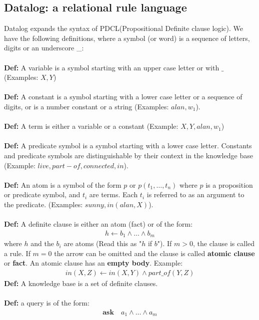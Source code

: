 \documentclass{article}
\def\blu#1{{\color{blu}#1}}
\def\red#1{{\color{red}#1}}
\begin{document}
\subsection*{Datalog: a relational rule language}
Datalog expands the syntax of PDCL(Propositional Definite clause logic). We have the following definitions, where a symbol (or word) is a sequence of letters, digits or an underscore \_:\\
\\
\textbf{Def:} A \red{variable} is a symbol starting with an upper case letter or with $ \_ $ (Examples: $ X, Y $) \\
\\
\textbf{Def:} A \red{constant} is a symbol starting with a lower case letter or a sequence of digits, or is a number constant or a string (Examples: $ alan, w_1 $). \\
\\
\textbf{Def:} A \red{term} is either a variable or a constant (Example: $ X, Y, alan, w_1 $)\\
\\
\textbf{Def:} A \red{predicate symbol} is a symbol starting with a lower case letter. Constants and predicate symbols are distinguishable by their context in the knowledge base (Example: $ live, part-of, connected, in $). \\
\\
\textbf{Def:} An \red{atom} is a symbol of the form \blu{$ p $} or \blu{$ p(t_1, \dots, t_n) $} where \blu{$ p $} is a proposition or predicate symbol, and \blu{$ t_i $} are terms. Each $ t_i $ is referred to as an argument to the predicate. (Examples: $ sunny, in(alan, X) $).\\
\\
\textbf{Def:} A \red{definite clause} is either an atom (fact) or of the form:
\begin{align*}
h \leftarrow b_1 \land \dots \land b_m
\end{align*} 
where $ h $ and the $ b_i $ are atoms (Read this as "$ h $ if $ b $"). If $ m>0 $, the clause is called a rule. If $ m=0 $ the arrow can be omitted and the clause is called \textbf{atomic clause }or \textbf{fact}. An atomic clause has an \textbf{empty body}. Example:
\begin{align*}
in(X,Z) \leftarrow in(X,Y) \land part\_of(Y,Z)
\end{align*}
\textbf{Def:} A \red{knowledge base} is a set of definite clauses.\\
\\
\textbf{Def:} a \red{query} is of the form:
\begin{align*}
\mathbf{ask} \quad a_1 \land \dots \land a_m
\end{align*}
\end{document}
